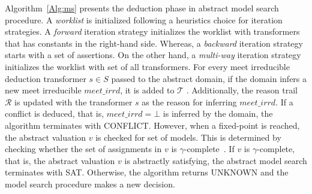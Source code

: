 Algorithm~\ref{Alg:ms} presents the deduction phase in abstract model search procedure.
A {\em worklist} is initialized following a heuristics choice for iteration 
strategies. A {\em forward} iteration strategy initializes the worklist with 
transformers that has constants in the right-hand side. Whereas, a {\em backward} 
iteration strategy starts with a set of assertions. On the other hand, a 
{\em multi-way} iteration strategy initializes the worklist with set of all 
transformers.  For every meet irreducible deduction transformer  $s \in S$ 
passed to the abstract domain, if the domain infers a new meet irreducible 
$\mathit{meet\_irrd}$, it is added to $\mathcal{T}$ .  Additionally, the reason 
trail $\mathcal{R}$  is updated with the transformer $s$ as the reason for inferring
$\mathit{meet\_irrd}$. If a conflict is deduced, that is, $\mathit{meet\_irrd} = \bot$ 
is inferred by the domain, the algorithm terminates with CONFLICT.  However,
when a fixed-point is reached, the abstract valuation $v$ is checked for set of
models.  This is determined by checking whether the set of assignments in $v$ is 
$\gamma$-complete~\cite{dhk2013-popl}. If $v$ is $\gamma$-complete, that is, the 
abstract valuation $v$ is abstractly satisfying, the abstract model 
search terminates with SAT.  Otherwise, the algorithm returns UNKNOWN and the 
model search procedure makes a new decision.    



